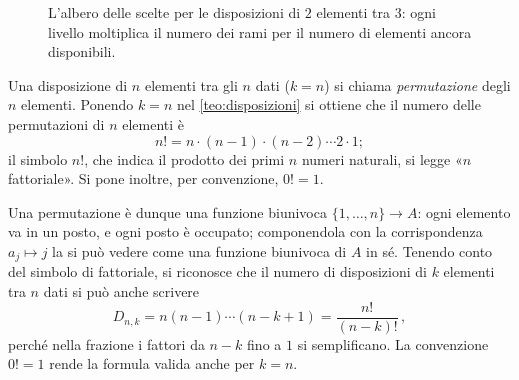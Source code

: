 \begin{figure}[htb]
\centering
{}
\caption{L'albero delle scelte per le disposizioni di $2$ elementi tra $3$: ogni
livello moltiplica il numero dei rami per il numero di elementi ancora disponibili.}
\label{fig:albero-disposizioni}
\end{figure}

\begin{definizione}
Una disposizione di $n$ elementi tra gli $n$ dati ($k=n$) si chiama \emph{permutazione}
degli $n$ elementi. Ponendo $k=n$ nel \cref{teo:disposizioni} si ottiene che il numero
delle permutazioni di $n$ elementi è
\begin{equation}\label{eq:fattoriale}
  n!=n\cdot(n-1)\cdot(n-2)\cdots2\cdot1;
\end{equation}
il simbolo $n!$, che indica il prodotto dei primi $n$ numeri naturali, si legge
«$n$ fattoriale». Si pone inoltre, per convenzione, $0!=1$.
\end{definizione}

Una permutazione è dunque una funzione biunivoca $\{1,\dots,n\}\to A$: ogni elemento va
in un posto, e ogni posto è occupato; componendola con la corrispondenza $a_{j}\mapsto j$
la si può vedere come una funzione biunivoca di $A$ in sé. Tenendo conto del simbolo di fattoriale, si
riconosce che il numero di disposizioni di $k$ elementi tra $n$ dati si può anche
scrivere
\begin{equation}\label{eq:disposizioni-fattoriale}
  D_{n,k}=n(n-1)\cdots(n-k+1)=\frac{n!}{(n-k)!}\,,
\end{equation}
perché nella frazione i fattori da $n-k$ fino a $1$ si semplificano. La convenzione
$0!=1$ rende la formula valida anche per $k=n$.

